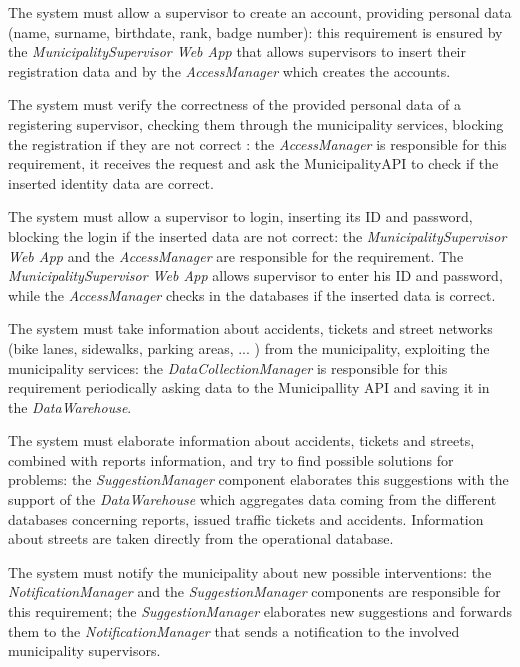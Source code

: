 \documentclass[a4paper]{report}
\begin{document}
\begin{enumerate}[start=1,label={[R\arabic*]}]
\item \label{[R38]}The system must allow a supervisor to create an account, providing personal data (name, surname, birthdate, rank, badge number): this requirement is ensured by the \textit{ MunicipalitySupervisor Web App} that allows supervisors to insert their registration data and by the \textit{AccessManager} which creates the accounts.
\item \label{[R39]}The system must verify the correctness of the provided personal data of a registering supervisor, checking them through the municipality services, blocking the registration if they are not correct : the \textit{AccessManager} is responsible for this requirement, it receives the request and ask the MunicipalityAPI to check if the inserted identity data are correct.
\item \label{[R40]}The system must allow a supervisor to login, inserting its ID and password, blocking the login if the inserted data are not correct: the \textit{MunicipalitySupervisor Web App} and the \textit{AccessManager} are responsible for the requirement. The \textit{MunicipalitySupervisor Web App} allows supervisor to enter his ID and password, while the \textit{AccessManager} checks in the databases if the inserted data is correct.
\item \label{[R41]}The system must take information about accidents, tickets and street networks (bike lanes, sidewalks, parking areas, ... ) from the municipality, exploiting the municipality services: the\textit{ DataCollectionManager} is responsible for this requirement periodically asking data to the Municipallity API and saving it in the \textit{DataWarehouse}.
\item \label{[R42]}The system must elaborate information about accidents, tickets and streets, combined with reports information, and try to find possible solutions for problems: the \textit{SuggestionManager} component elaborates this suggestions with the support of the \textit{DataWarehouse} which aggregates data coming from the different databases concerning reports, issued traffic tickets and accidents. Information about streets are taken directly from the operational database.
\item \label{[R43]}The system must notify the municipality about new possible interventions: the \textit{NotificationManager} and the \textit{SuggestionManager} components are responsible for this requirement; the \textit{SuggestionManager} elaborates new suggestions and forwards them to the \textit{NotificationManager} that sends a notification to the involved municipality supervisors.

\end{enumerate}
\end{document}

